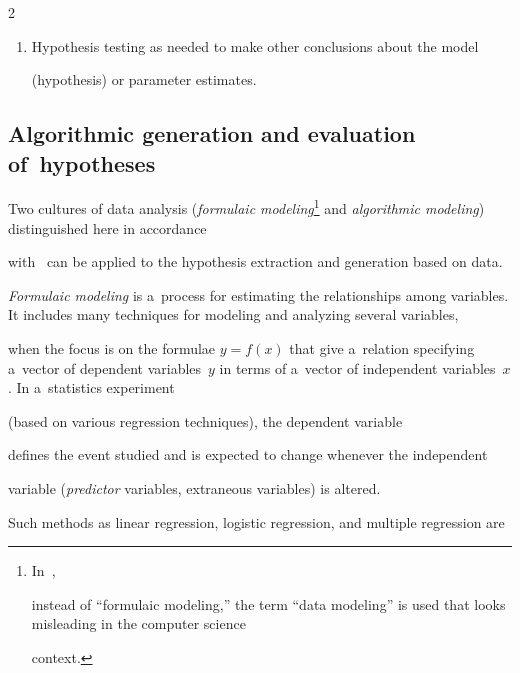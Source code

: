\begin{multicols}{2}
\begin{enumerate}[1.]
\item Hypothesis testing as needed to make other conclusions about the model


(hypothesis) or parameter estimates.


\end{enumerate}





\vspace*{-6pt}





\subsection{Algorithmic generation and evaluation of~hypotheses}





\vspace*{-2pt}





\noindent


  Two cultures of data analysis (\textit{formulaic modeling}\footnote{In~\cite{36-kl},


instead of ``formulaic modeling,'' the term ``data modeling'' is used that looks misleading in the computer science


context.} and \textit{algorithmic modeling}) distinguished here in accordance


with~\cite{36-kl} can be applied to the hypothesis extraction and generation based on data.





  \textit{Formulaic modeling} is a~process for estimating the relationships among variables. It includes many techniques for modeling and analyzing several variables,


when the focus is on the formulae $y = f(x)$ that give a~relation specifying a~vector of dependent variables~$y$ in terms of a~vector of independent variables~$x$. In a~statistics experiment


(based on various regression techniques), the dependent variable


defines the event studied and is expected to change whenever the independent


variable (\textit{predictor} variables, extraneous variables) is altered.


Such methods as linear regression, logistic regression, and multiple regression are



\end{multicols}

